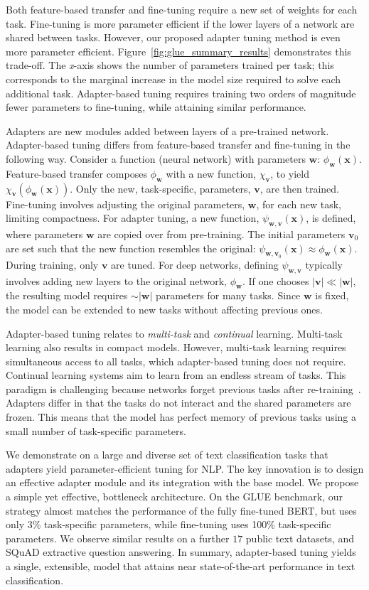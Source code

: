 Both feature-based transfer and fine-tuning require a new set of weights for each task.
Fine-tuning is more parameter efficient if the lower layers of a network are shared between tasks.
However, our proposed adapter tuning method is even more parameter efficient.
Figure~\ref{fig:glue_summary_results} demonstrates this trade-off.
The \emph{x}-axis shows the number of parameters trained per task;
this corresponds to the marginal increase in the model size required to solve each additional task.
Adapter-based tuning requires training two orders of magnitude fewer parameters to fine-tuning, while attaining similar performance.

Adapters are new modules added between layers of a pre-trained network.
Adapter-based tuning differs from feature-based transfer and fine-tuning in the following way.
Consider a function (neural network) with parameters $\bm w$: $\phi_{\bm w}(\bm x)$.
Feature-based transfer composes $\phi_{\bm w}$ with a new function, $\chi_{\bm v}$, to yield $\chi_{\bm v}(\phi_{\bm w}(\bm x))$.
Only the new, task-specific, parameters, $\bm v$, are then trained.
Fine-tuning involves adjusting the original parameters, $\bm w$, for each new task, limiting compactness.
For adapter tuning, a new function, $\psi_{\bm w, \bm v}(\bm x)$, is defined, where parameters $\bm w$ are copied over from pre-training.
The initial parameters $\bm v_0$ are set such that the new function resembles the original: $\psi_{\bm w, \bm v_0}(\bm x) \approx \phi_{\bm w}(\bm x)$.
During training, only $\bm v$ are tuned.
For deep networks, defining $\psi_{\bm w, \bm v}$ typically involves adding new layers to the original network, $\phi_{\bm w}$.
If one chooses $|\bm v|\ll|\bm w|$, the resulting model requires $\sim|\bm w|$ parameters for many tasks.
Since $\bm w$ is fixed, the model can be extended to new tasks without affecting previous ones.

Adapter-based tuning relates to \emph{multi-task} and \emph{continual} learning.
Multi-task learning also results in compact models.
However, multi-task learning requires simultaneous access to all tasks, which adapter-based tuning does not require.
Continual learning systems aim to learn from an endless stream of tasks.
This paradigm is challenging because networks forget previous tasks after re-training~\citep{mccloskey1989catastrophic,french1999catastrophic}.
Adapters differ in that the tasks do not interact and the shared parameters are frozen.
This means that the model has perfect memory of previous tasks using a small number of task-specific parameters.

We demonstrate on a large and diverse set of text classification tasks that adapters yield parameter-efficient tuning for NLP.
The key innovation is to design an effective adapter module and its integration with the base model.
We propose a simple yet effective, bottleneck architecture.
On the GLUE benchmark, our strategy almost matches the performance of the fully fine-tuned BERT,
but uses only 3\% task-specific parameters, while fine-tuning uses 100\% task-specific parameters.
We observe similar results on a further $17$ public text datasets, and SQuAD extractive question answering.
In summary, adapter-based tuning yields a single, extensible, model that attains near state-of-the-art performance in text classification.
